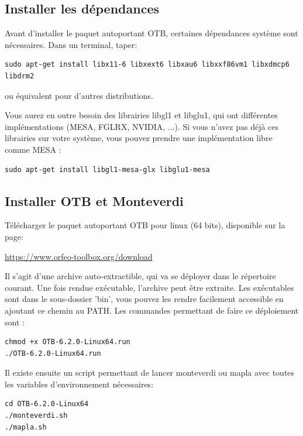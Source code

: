 \documentclass[10pt,a4paper]{article}
\begin{document}
\subsection{Installer les dépendances}
Avant d'installer le paquet autoportant OTB, certaines dépendances système
sont nécessaires. Dans un terminal, taper:
\begin{verbatim}
sudo apt-get install libx11-6 libxext6 libxau6 libxxf86vm1 libxdmcp6 libdrm2
\end{verbatim}
ou équivalent pour d'autres distributions.

Vous aurez en outre besoin des librairies libgl1 et libglu1, qui ont
différentes implémentations (MESA, FGLRX, NVIDIA, ...). Si vous n'avez pas
déjà ces librairies sur votre système, vous pouvez prendre une implémentation
libre comme MESA :
\begin{verbatim}
sudo apt-get install libgl1-mesa-glx libglu1-mesa
\end{verbatim}

\subsection{Installer OTB et Monteverdi}
Télécharger le paquet autoportant OTB pour linux (64 bits), disponible sur la
page:
\begin{center}
\url{https://www.orfeo-toolbox.org/download}
\end{center}

Il s'agit d'une archive auto-extractible, qui va se déployer dans le répertoire
courant. Une fois rendue exécutable, l'archive peut être extraite. Les
exécutables sont dans le sous-dossier 'bin', vous pouvez les rendre facilement
accessible en ajoutant ce chemin au PATH. Les commandes permettant de faire
ce déploiement sont :
\begin{verbatim}
chmod +x OTB-6.2.0-Linux64.run
./OTB-6.2.0-Linux64.run
\end{verbatim}

Il existe ensuite un script permettant de lancer monteverdi ou mapla avec toutes les
variables d'environnement nécessaires:
\begin{verbatim}
cd OTB-6.2.0-Linux64
./monteverdi.sh
./mapla.sh
\end{verbatim}
\end{document}
